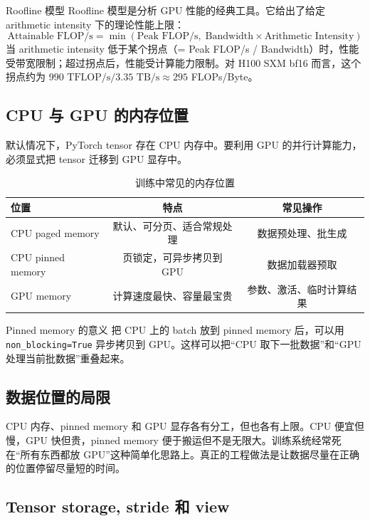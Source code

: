 \begin{knowledgebox}{Roofline 模型}
Roofline 模型是分析 GPU 性能的经典工具。它给出了给定 arithmetic intensity 下的理论性能上限：
$$
\text{Attainable FLOP/s} = \min\left(\text{Peak FLOP/s},\;\text{Bandwidth} \times \text{Arithmetic Intensity}\right)
$$
当 arithmetic intensity 低于某个拐点（= Peak FLOP/s / Bandwidth）时，性能受带宽限制；超过拐点后，性能受计算能力限制。对 H100 SXM bf16 而言，这个拐点约为 $990 \text{ TFLOP/s} / 3.35 \text{ TB/s} \approx 295$ FLOPs/Byte。
\end{knowledgebox}

\subsection{CPU 与 GPU 的内存位置}

默认情况下，PyTorch tensor 存在 CPU 内存中。要利用 GPU 的并行计算能力，必须显式把 tensor 迁移到 GPU 显存中。

\begin{table}[H]
\centering
\begin{tabular}{lcc}
\toprule
\textbf{位置} & \textbf{特点} & \textbf{常见操作} \\
\midrule
CPU paged memory & 默认、可分页、适合常规处理 & 数据预处理、批生成 \\
CPU pinned memory & 页锁定，可异步拷贝到 GPU & 数据加载器预取 \\
GPU memory & 计算速度最快、容量最宝贵 & 参数、激活、临时计算结果 \\
\bottomrule
\end{tabular}
\caption{训练中常见的内存位置}
\end{table}

\begin{knowledgebox}{Pinned memory 的意义}
把 CPU 上的 batch 放到 pinned memory 后，可以用 \texttt{non\_blocking=True} 异步拷贝到 GPU。这样可以把“CPU 取下一批数据”和“GPU 处理当前批数据”重叠起来。
\end{knowledgebox}

\subsection{数据位置的局限}

CPU 内存、pinned memory 和 GPU 显存各有分工，但也各有上限。CPU 便宜但慢，GPU 快但贵，pinned memory 便于搬运但不是无限大。训练系统经常死在“所有东西都放 GPU”这种简单化思路上。真正的工程做法是让数据尽量在正确的位置停留尽量短的时间。

\subsection{Tensor storage, stride 和 view}

